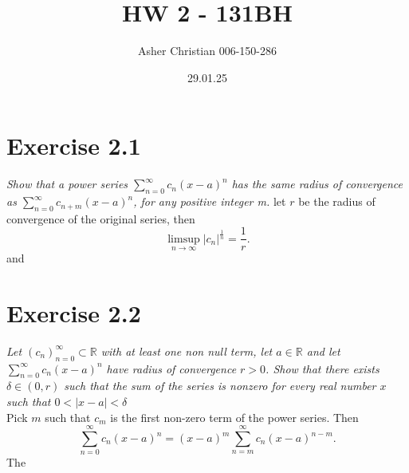 \documentclass{amsart}
\title{HW 2 - 131BH}
\author{Asher Christian 006-150-286}
\date{ 29.01.25}
\begin{document}
    \maketitle
    \section{Exercise 2.1}
    \emph{
        Show that a power series $\sum_{n=0}^{\infty}c_n(x-a)^{n}$ has the same radius
        of convergence as $\sum_{n=0}^{\infty}c_{n+m}(x-a)^{n}$, for any positive integer m.
    }
    let $r$ be the radius of convergence of the original series, then
    \[
    \limsup_{n\to \infty}|c_n|^{\frac{1}{n}} = \frac{1}{r}
    .\] 
    and

    \section{Exercise 2.2}
    \emph{
        Let $(c_n)_{n=0}^{\infty} \subset \mathbb{R}$ with at least one non null term,
        let $a \in \mathbb{R}$ and let $\sum_{n=0}^{\infty}c_n(x-a)^{n}$ have
        radius of convergence $r > 0$. Show that there exists
        $\delta \in (0,r)$ such that the sum of the series
        is nonzero for every real number $x$ such that $0 < |x-a| < \delta$
    }\\
    Pick $m$ such that $c_m$ is the first non-zero term of the power series.
    Then
     \[
    \sum_{n=0}^{\infty}c_n(x-a)^{n} = (x-a)^{m}\sum_{n=m}^{\infty}c_n(x-a)^{n-m}
    .\] 
    The
\end{document}
